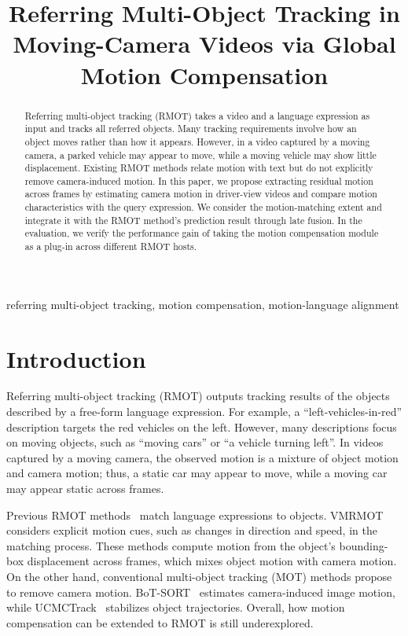 \documentclass{article}
\title{Referring Multi-Object Tracking in Moving-Camera Videos via Global Motion Compensation}
\begin{document}
\ninept
%
\maketitle
%
\begin{abstract}
  Referring multi-object tracking (RMOT) takes a video and a language expression as input and tracks all referred objects. Many tracking requirements involve how an object moves rather than how it appears. However, in a video captured by a moving camera, a parked vehicle may appear to move, while a moving vehicle may show little displacement. Existing RMOT methods relate motion with text but do not explicitly remove camera-induced motion. In this paper, we propose extracting residual motion across frames by estimating camera motion in driver-view videos and compare motion characteristics with the query expression. We consider the motion-matching extent and integrate it with the RMOT method's prediction result through late fusion. In the evaluation, we verify the performance gain of taking the motion compensation module as a plug-in across different RMOT hosts.
\end{abstract}
%
\begin{keywords}
  referring multi-object tracking, motion compensation, motion-language alignment
\end{keywords}


\section{Introduction}
\label{sec:intro}
Referring multi-object tracking (RMOT) outputs tracking results of the objects described by a free-form language expression. For example, a \enquote{left-vehicles-in-red} description targets the red vehicles on the left. However, many descriptions focus on moving objects, such as \enquote{moving cars} or \enquote{a vehicle turning left}. In videos captured by a moving camera, the observed motion is a mixture of object motion and camera motion; thus, a static car may appear to move, while a moving car may appear static across frames.

Previous RMOT methods~\cite{transrmot,ikun,flexhook} match language expressions to objects. VMRMOT~\cite{vmrmot} considers explicit motion cues, such as changes in direction and speed, in the matching process. These methods compute motion from the object's bounding-box displacement across frames, which mixes object motion with camera motion. On the other hand, conventional multi-object tracking (MOT) methods propose to remove camera motion. BoT-SORT~\cite{botsort} estimates camera-induced image motion, while UCMCTrack~\cite{ucmctrack} stabilizes object trajectories. Overall, how motion compensation can be extended to RMOT is still underexplored.
\end{document}
